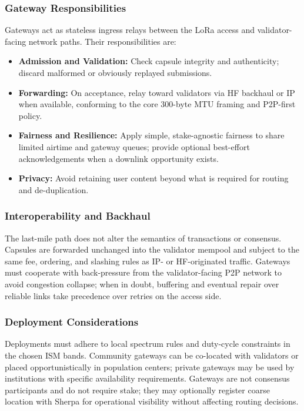 \documentclass{article}
\begin{document}
\subsubsection{Gateway Responsibilities}

Gateways act as stateless ingress relays between the LoRa access and validator-facing network paths. Their responsibilities are:
\begin{itemize}
    \item \textbf{Admission and Validation:} Check capsule integrity and authenticity; discard malformed or obviously replayed submissions.
    \item \textbf{Forwarding:} On acceptance, relay toward validators via HF backhaul or IP when available, conforming to the core 300-byte MTU framing and P2P-first policy.
    \item \textbf{Fairness and Resilience:} Apply simple, stake-agnostic fairness to share limited airtime and gateway queues; provide optional best-effort acknowledgements when a downlink opportunity exists.
    \item \textbf{Privacy:} Avoid retaining user content beyond what is required for routing and de-duplication.
\end{itemize}

\subsubsection{Interoperability and Backhaul}

The last-mile path does not alter the semantics of transactions or consensus. Capsules are forwarded unchanged into the validator mempool and subject to the same fee, ordering, and slashing rules as IP- or HF-originated traffic. Gateways must cooperate with back-pressure from the validator-facing P2P network to avoid congestion collapse; when in doubt, buffering and eventual repair over reliable links take precedence over retries on the access side.

\subsubsection{Deployment Considerations}

Deployments must adhere to local spectrum rules and duty-cycle constraints in the chosen ISM bands. Community gateways can be co-located with validators or placed opportunistically in population centers; private gateways may be used by institutions with specific availability requirements. Gateways are not consensus participants and do not require stake; they may optionally register coarse location with Sherpa for operational visibility without affecting routing decisions.
\end{document}
